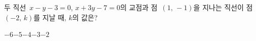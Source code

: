 두 직선~$x-y-3=0$, $x+3y-7=0$의 교점과 점~$(1,\,-1)$을 지나는 직선이 점~$(-2,\,k)$를 지날 때, $k$의 값은?
\begin{choices32}{$-6$}{$-5$}{$-4$}{$-3$}{$-2$}\end{choices32}

